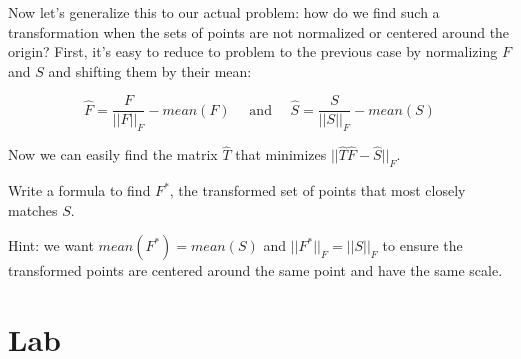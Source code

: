 \documentclass[paper=a4, fontsize=11pt]{scrartcl} %
\begin{document}
Now let's generalize this to our actual problem: how do we find such a transformation when the sets of points are not normalized or centered around the origin?  First, it's easy to reduce to problem to the previous case by normalizing $F$ and $S$ and shifting them by their mean:

$$
\hat{F} = \frac{F}{||F||_F} - mean(F)\quad\textrm{ and }\quad\hat{S} = \frac{S}{||S||_F} - mean(S)
$$

Now we can easily find the matrix $\hat{T}$ that minimizes $||\hat{T}\hat{F}-\hat{S}||_F$.

Write a formula to find $F^*$, the transformed set of points that most closely matches $S$.

Hint: we want $mean(F^*) = mean(S)$ and $||F^*||_F=||S||_F$ to ensure the transformed points are centered around the same point and have the same scale.

\section{Lab}
\end{document}
